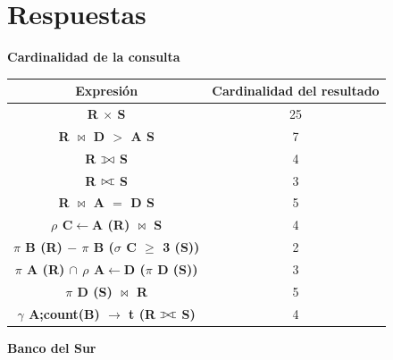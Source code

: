 \documentclass{exam}
\def\ojoin{\setbox0=\hbox{$\bowtie$}%
  \rule[-.02ex]{.25em}{.4pt}\llap{\rule[\ht0]{.25em}{.4pt}}}
\def\leftouterjoin{\mathbin{\ojoin\mkern-5.8mu\bowtie}}
\def\rightouterjoin{\mathbin{\bowtie\mkern-5.8mu\ojoin}}
\def\fullouterjoin{\mathbin{\ojoin\mkern-5.8mu\bowtie\mkern-5.8mu\ojoin}}
\begin{document}
\section*{Respuestas}
\begin{questions}
	\question \textbf{Cardinalidad de la consulta}
	\begin{center}
		\begin{tabular}{| c | c |}
			\hline
		    Expresión & Cardinalidad del resultado\\ \hline
	        \textbf{R $\times$ S} & 25 \\ \hline
    	    \textbf{R $\bowtie$ D $>$ A S} & 7 \\ \hline
	        \textbf{R $\leftouterjoin$ S} & 4 \\ \hline
    	    \textbf{R $\rightouterjoin$ S} & 3 \\ \hline
	        \textbf{R $\bowtie$ A $=$ D S} & 5 \\ \hline
    	    \textbf{$\rho$ C$\leftarrow$A (R) $\bowtie$ S} & 4 \\ \hline
	        \textbf{$\pi$ B (R) $-$ $\pi$ B ($\sigma$ C $\geqslant$ 3 (S))} & 2 \\ \hline
    	    \textbf{$\pi$ A (R) $\cap$ $\rho$ A$\leftarrow$D ($\pi$ D (S))} & 3 \\ \hline
	        \textbf{$\pi$ D (S) $\bowtie$ R} & 5 \\ \hline
    	    \textbf{$\gamma$ A;count(B) $\longrightarrow$ t (R $\fullouterjoin$ S)} & 4 \\ \hline
	    \end{tabular} 		
	\end{center}

	\newpage
	\question \textbf{Banco del Sur}
	

\end{questions}
\end{document}
